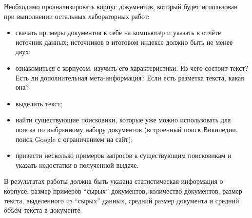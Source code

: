 
Необходимо проанализировать корпус документов, который будет использован при
выполнении остальных лабораторных работ:
\begin{itemize}
    \item скачать примеры документов к себе на компьютер и указать в отчёте
          источник данных; источников в итоговом индексе должно быть не менее
          двух;
    \item ознакомиться с корпусом, изучить его характеристики. Из чего состоит
          текст? Есть ли дополнительная мета-информация? Если есть разметка
          текста, какая она?
    \item выделить текст;
    \item найти существующие поисковики, которые уже можно использовать для
          поиска по выбранному набору документов (встроенный поиск Википедии,
          поиск Google с ограничением на сайт);
    \item привести несколько примеров запросов к существующим поисковикам и
          указать недостатки в полученной выдаче.
\end{itemize}

В результатах работы должна быть указана статистическая информация о корпусе:
размер примеров \enquote{сырых} документов, количество документов, размер
текста, выделенного из \enquote{сырых} данных, средний размер документа и средний
объём текста в документе.

\pagebreak
